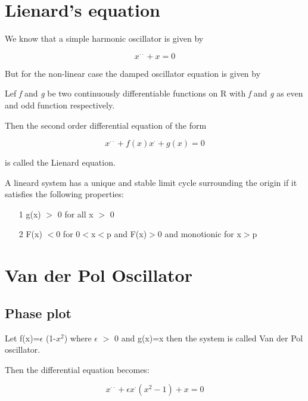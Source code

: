 \documentclass[11pt,a4 paper]{report}
\begin{document}
\chapter{Lienard's equation}
\par
We know that a simple harmonic oscillator is given by 

\begin{equation}
x^{\cdot\cdot}+x=0
\end{equation}

\par
But for the non-linear case the damped oscillator equation is given by \cite{book1}


Lef \textit{f} and \textit{g} be two continuously differentiable functions on R with \textit{f} and \textit{g} as even and odd function respectively.

Then the second order differential equation of the form \nocite{book2}

\begin{equation}
x^{ \cdot\cdot }+ f \left( x \right) x^{\cdot} + g\left(x\right) = 0
\end{equation}

is called the Lienard equation.

\par 
A lineard system has a unique and stable limit cycle surrounding the origin if it satisfies the following properties:

\begin{itemize}
 
\item[1]
g(x) $>$ 0 for all x $>$ 0
\item[2]
F(x) $<$0 for 0$<$x$<$p and F(x)$>$0 and monotionic for x$>$p
\end{itemize}

\chapter{Van der Pol Oscillator}
\section{Phase plot}
\par 
Let f(x)=$\epsilon$ (1-$x^{2}$) where $\epsilon$ $>$ 0 and g(x)=x then the system is called Van der Pol oscillator.

Then the differential equation becomes:

\begin{equation}
x^{ \cdot\cdot }+\epsilon x^{\cdot} \left( x^{2} -1 \right) + x = 0
\end{equation}
\end{document}
